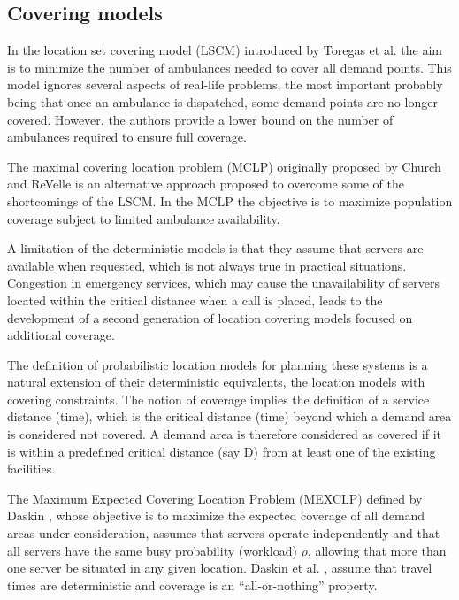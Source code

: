 \subsection{Covering models}
In the location set covering model (LSCM)
introduced by Toregas et al. \cite{toregas1971location}
the aim
is to minimize
the number of ambulances needed
to cover all demand points.
This model
ignores several aspects of real-life problems,
the most important
probably being that
once an ambulance is dispatched,
some demand points
are no longer covered.
However,
the authors provide
a lower bound
on the number of ambulances
required to ensure full coverage.

The maximal covering location problem (MCLP)
originally proposed by Church and ReVelle \cite{church1974maximal}
is an alternative approach
proposed to overcome some of the shortcomings of the LSCM.
In the MCLP the objective is to maximize population coverage
subject to limited ambulance availability.

A limitation of the deterministic models
is that
they assume
that servers are available when requested,
which is not always true in practical situations.
Congestion in emergency services,
which may cause
the unavailability of servers located
within the critical distance
when a call is placed,
leads to
the development of
a second generation of location covering models
focused on additional coverage.

The definition of
probabilistic location models for planning these systems
is a natural extension
of their deterministic equivalents,
the location models with covering constraints.
The notion of coverage
implies
the definition of a service distance (time),
which is the critical distance (time)
beyond which a demand area is considered not covered.
A demand area is
therefore
considered as covered
if
it is within a predefined critical distance (say D)
from at least one of the existing facilities.

The Maximum Expected Covering Location Problem (MEXCLP)
defined by Daskin \cite{daskin1983maximum},
whose objective is to
maximize the expected coverage
of all demand areas under consideration,
assumes that servers operate independently
and that all servers have the same busy probability (workload) $\rho$,
allowing that more than one server be situated in any given location.
Daskin et al. \cite{daskin1981hierarchical},
assume
that travel times are deterministic
and coverage is an ``all-or-nothing'' property.

